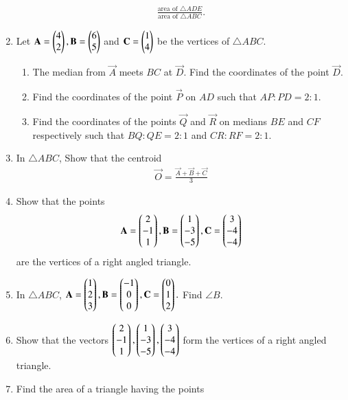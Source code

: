 \begin{enumerate}[label=\arabic*.,ref=\thesubsection.\theenumi]
\begin{align}
\frac{\text{area of }\triangle ADE}{\text{area of }\triangle ABC}.
\end{align}
\item Let $\mathbf{A}=\begin{pmatrix}4\\2\end{pmatrix},  \mathbf{B}=\begin{pmatrix}6\\5\end{pmatrix}$ and  $\mathbf{C} =  \begin{pmatrix}1\\4\end{pmatrix}$ be the vertices of $\triangle ABC$.
\begin{enumerate}
\item The median from $\vec{A}$ meets $BC$ at $\vec{D}$.  Find the coordinates of the point $\vec{D}$.
\item Find the coordinates of the point $\vec{P}$ on $AD$ such that $AP:PD = 2:1$.
\item Find the coordinates of the points $\vec{Q}$ and $\vec{R}$ on medians $BE$ and $CF$ respectively such that $BQ:QE = 2:1$ and $CR:RF = 2:1$.
\end{enumerate}
\item In $\triangle ABC$, Show that the centroid 
\begin{align}
\vec{O} = \frac{\vec{A}+\vec{B}+\vec{C}}{3}
\end{align}
\item Show that the points 
\begin{align}
\mathbf{A} = \begin{pmatrix}2\\-1 \\1\end{pmatrix},
\mathbf{B} = \begin{pmatrix}1\\-3 \\-5\end{pmatrix},
\mathbf{C} = \begin{pmatrix}3\\ -4\\-4\end{pmatrix}
\end{align}
%
are the vertices of a right angled triangle.
\item In $\triangle ABC$, 
$
\mathbf{A} = \begin{pmatrix}1\\2 \\3\end{pmatrix},
\mathbf{B} = \begin{pmatrix}-1\\0 \\0\end{pmatrix},
\mathbf{C} = \begin{pmatrix}0\\ 1\\2\end{pmatrix}.
$
Find $\angle B$.
\item Show that the vectors 
$
\begin{pmatrix}2\\-1 \\1\end{pmatrix},
\begin{pmatrix}1\\-3 \\-5\end{pmatrix},
\begin{pmatrix}3\\ -4\\-4\end{pmatrix}
$
form the vertices of a right angled triangle.
\item Find the area of a triangle having the points 

\end{enumerate}
